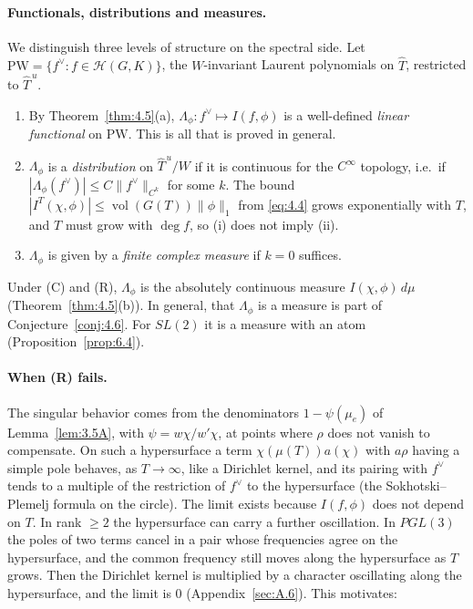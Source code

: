 \documentclass[12pt,letterpaper]{article}
\numberwithin{equation}{section}
\theoremstyle{plain}
\theoremstyle{remark}
\theoremstyle{plain}
\theoremstyle{definition}
\theoremstyle{remark}
\theoremstyle{remark}
\newcommand{\Hc}{\mathcal{H}}
\newcommand{\Th}{\widehat{T}}
\newcommand{\Thu}{\widehat{T}^{\,u}}
\DeclareMathOperator{\vol}{vol}
\begin{document}
\paragraph{Functionals, distributions and measures.} We distinguish three levels of structure on the spectral side. Let $\mathrm{PW}=\{f^\vee:f\in\Hc(G,K)\}$, the $W$-invariant Laurent polynomials on $\Th$, restricted to $\Thu$.
\begin{enumerate}[label=(\roman*)]
\item By Theorem~\ref{thm:4.5}(a), $\Lambda_\phi:f^\vee\mapsto I(f,\phi)$ is a well-defined \emph{linear functional} on $\mathrm{PW}$. This is all that is proved in general.
\item $\Lambda_\phi$ is a \emph{distribution} on $\Thu/W$ if it is continuous for the $C^\infty$ topology, i.e.\ if $|\Lambda_\phi(f^\vee)|\le C\|f^\vee\|_{C^k}$ for some $k$. The bound $|I^T(\chi,\phi)|\le\vol(G(T))\|\phi\|_1$ from \eqref{eq:4.4} grows exponentially with $T$, and $T$ must grow with $\deg f$, so (i) does not imply (ii).
\item $\Lambda_\phi$ is given by a \emph{finite complex measure} if $k=0$ suffices.
\end{enumerate}
Under (C) and (R), $\Lambda_\phi$ is the absolutely continuous measure $I(\chi,\phi)\,d\mu$ (Theorem~\ref{thm:4.5}(b)). In general, that $\Lambda_\phi$ is a measure is part of Conjecture~\ref{conj:4.6}. For $SL(2)$ it is a measure with an atom (Proposition~\ref{prop:6.4}).

\paragraph{When (R) fails.} The singular behavior comes from the denominators $1-\psi(\mu_e)$ of Lemma~\ref{lem:3.5A}, with $\psi=w\chi/w'\chi$, at points where $\rho$ does not vanish to compensate. On such a hypersurface a term $\chi(\mu(T))a(\chi)$ with $a\rho$ having a simple pole behaves, as $T\to\infty$, like a Dirichlet kernel, and its pairing with $f^\vee$ tends to a multiple of the restriction of $f^\vee$ to the hypersurface (the Sokhotski--Plemelj formula on the circle). The limit exists because $I(f,\phi)$ does not depend on $T$. In rank $\ge2$ the hypersurface can carry a further oscillation. In $PGL(3)$ the poles of two terms cancel in a pair whose frequencies agree on the hypersurface, and the common frequency still moves along the hypersurface as $T$ grows. Then the Dirichlet kernel is multiplied by a character oscillating along the hypersurface, and the limit is $0$ (Appendix~\ref{sec:A.6}). This motivates:
\end{document}
